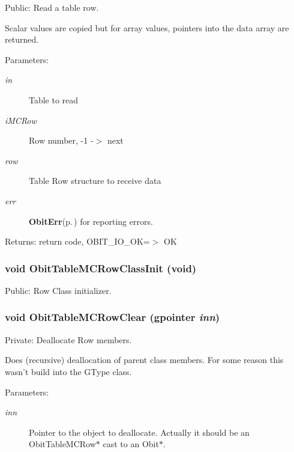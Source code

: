 Public: Read a table row. 

Scalar values are copied but for array values, pointers into the data array are returned. \begin{Desc}
\item[Parameters:]
\begin{description}
\item[{\em in}]Table to read \item[{\em i\-MCRow}]Row number, -1 -$>$ next \item[{\em row}]Table Row structure to receive data \item[{\em err}]{\bf Obit\-Err}{\rm (p.\,\pageref{structObitErr})} for reporting errors. \end{description}
\end{Desc}
\begin{Desc}
\item[Returns:]return code, OBIT\_\-IO\_\-OK=$>$ OK \end{Desc}
\subsubsection{\setlength{\rightskip}{0pt plus 5cm}void Obit\-Table\-MCRow\-Class\-Init (void)}\label{ObitTableMC_8c_a26}


Public: Row Class initializer. 

\subsubsection{\setlength{\rightskip}{0pt plus 5cm}void Obit\-Table\-MCRow\-Clear (gpointer {\em inn})}\label{ObitTableMC_8c_a7}


Private: Deallocate Row members. 

Does (recursive) deallocation of parent class members. For some reason this wasn't build into the GType class. \begin{Desc}
\item[Parameters:]
\begin{description}
\item[{\em inn}]Pointer to the object to deallocate. Actually it should be an Obit\-Table\-MCRow$\ast$ cast to an Obit$\ast$. \end{description}
\end{Desc}
